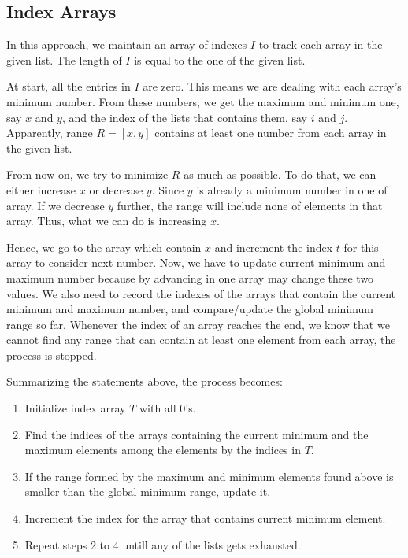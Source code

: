 \subsection{Index Arrays}
In this approach, we maintain an array of indexes $I$ to track each array in the given list. The length of $I$ is equal to the one of the given list.

At start, all the entries in $I$ are zero. This means we are dealing with each array's minimum number. From these numbers, we get the maximum and minimum one, say $x$ and $y$, and the index of the lists that contains them, say $i$ and $j$. Apparently, range $R=[x,y]$ contains at least one number from each array in the given list. 

From now on, we try to minimize $R$ as much as possible. To do that, we can either increase $x$ or decrease $y$. Since $y$ is already a minimum number in one of array. If we decrease $y$ further, the range will include none of elements in that array. Thus, what we can do is increasing $x$.

Hence, we go to the array which contain $x$ and increment the index $t$ for this array to consider next number. Now, we have to update current minimum and maximum number because by advancing in one array may change these two values. We also need to record the indexes of the arrays that contain the current minimum and maximum number, and compare/update the global minimum range so far.
Whenever the index of an array reaches the end, we know that we cannot find any range that can contain at least one element from each array, the process is stopped.

Summarizing the statements above, the process becomes:

\begin{enumerate}
\item Initialize index array $T$ with all 0's.

\item Find the indices of the arrays containing the current minimum and the maximum elements among the elements by the indices in $T$.

\item If the range formed by the maximum and minimum elements found above is smaller than the global minimum range, update it.

\item Increment the index for the array that contains current minimum element.

\item   Repeat steps 2 to 4 untill any of the lists gets exhausted.

\end{enumerate}

